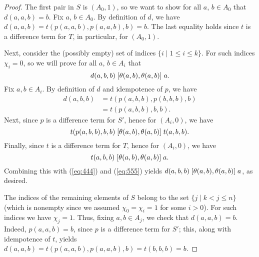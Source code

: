\begin{proof}
The first pair in $S$ is $(A_0, 1)$, so we want to show for all $a$, $b \in A_0$ that
$d(a,a,b) = b$.
Fix $a$, $b \in A_0$. By definition of $d$,
we have $d(a,a,b) = t(p(a,a,b), p(a,a,b), b) =b$.
The last equality holds since $t$ is a \glocal difference term for $T$, in particular,
for $(A_0, 1)$.

Next, consider the (possibly empty) set of indices $\{i \mid 1\leq i \leq k\}$.
For such indices $\chi_i =0$, so we will prove
for all $a$, $b \in A_i$ that
\[
d(a,b,b) \mathrel{[\theta(a,b), \theta(a,b)]} a.
\]
Fix $a, b\in A_i$.
By definition of $d$ and idempotence of $p$, we have
\begin{align}
  d(a,b,b) &=
  t(p(a,b,b), p(b,b,b), b)   \label{eq:444}\\
  &=t(p(a,b,b), b, b). \nonumber
\end{align}
Next, since $p$ is a \glocal difference term for $S'$,
hence for $(A_i, 0)$, we have
\begin{equation}
  \label{eq:555}
  t(p(a,b,b), b, b)
 \comm{\theta(a,b)}{\theta(a,b)}
 t(a, b, b).
\end{equation}
Finally, since $t$ is a \glocal difference term for $T$, hence for
$(A_i, 0)$,  %
we have 
\[
t(a, b, b) \mathrel{[\theta(a,b), \theta(a,b)]} a.
\]
Combining this with (\ref{eq:444}) and (\ref{eq:555}) yields
$d(a,b,b) \mathrel{[\theta(a,b), \theta(a,b)]} a$,
as desired.

The indices of the remaining elements of $S$
belong to the set $\{j \mid k<j\leq n\}$ (which is nonempty since we
assumed $\chi_0 = \chi_i = 1$ for some $i>0$).
For such indices we have $\chi_j = 1$.
Thus, fixing $a, b \in A_j$, we check that $d(a,a,b) = b$.
Indeed, $p(a,a,b) = b$, since $p$ is a \glocal difference term for $S'$; 
this, along with idempotence of $t$, yields
$d(a,a,b) =t(p(a,a,b), p(a,a,b), b)=t(b, b, b) =b$.
\end{proof}


